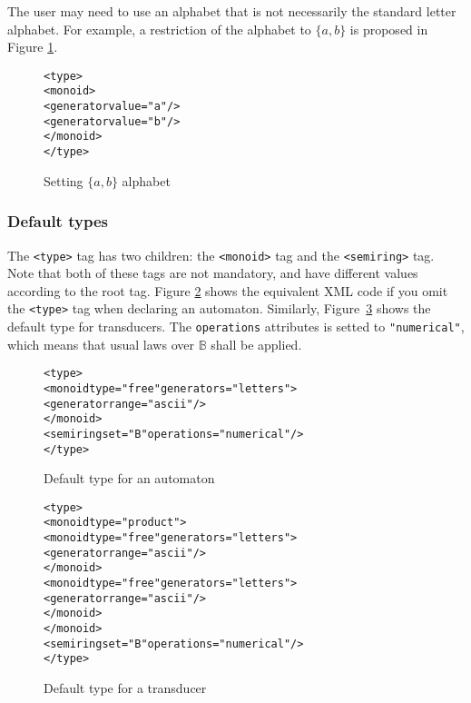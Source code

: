 \documentclass[a4paper]{article}
\begin{document}
The user may need to use an alphabet that is not necessarily the
standard letter alphabet. For example, a restriction of the alphabet
to $\{a, b\}$ is proposed in Figure \ref{alpha1}.


{\small

\begin{figure}[h]
  \begin{center}
\begin{alltt}
<type>
  <monoid>
     <generator value="a"/>
     <generator value="b"/>
  </monoid>
</type>
\end{alltt}

\caption{Setting $\{a, b\}$ alphabet}
\label{alpha1}
  \end{center}
\end{figure}

}


\subsubsection{Default types}

The \verb|<type>| tag has two children: the \verb|<monoid>| tag and
the \verb|<semiring>| tag. Note that both of these tags are not
mandatory, and have different values according to the root tag. Figure
\ref{automatontype} shows the equivalent XML code if you omit the
\verb|<type>| tag when declaring an automaton. Similarly,
Figure~\ref{transducertype} shows the default type for transducers.
The \verb|operations| attributes is setted to \verb|"numerical"|,
which means that usual laws over $\mathbb{B}$ shall be applied.

\begin{figure}[h]
  \begin{center}
\begin{alltt}
<type>
  <monoid type="free" generators="letters">
     <generator range="ascii"/>
  </monoid>
  <semiring set="B" operations="numerical"/>
</type>
\end{alltt}

\caption{Default type for an automaton}
\label{automatontype}
  \end{center}
\end{figure}


\begin{figure}[h]
  \begin{center}
\begin{alltt}
<type>
  <monoid type="product">
     <monoid type="free" generators="letters">
       <generator range="ascii"/>
     </monoid>
     <monoid type="free" generators="letters">
       <generator range="ascii"/>
     </monoid>
  </monoid>
  <semiring set="B" operations="numerical"/>
</type>
\end{alltt}

\caption{Default type for a transducer}
\label{transducertype}
  \end{center}
\end{figure}
\end{document}
